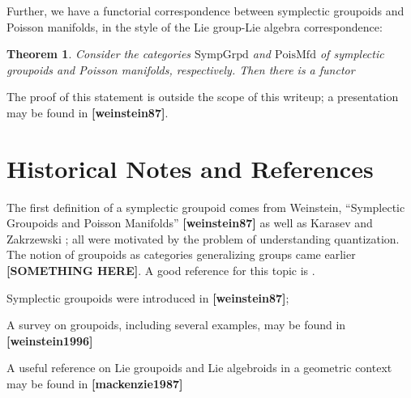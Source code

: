 \documentclass{tufte-handout}
\newtheorem{thrm}{Theorem}
\begin{document}
Further, we have a functorial correspondence between symplectic groupoids and Poisson manifolds, in the style of the Lie group-Lie algebra correspondence:
\begin{thrm}
Consider the categories $\mathrm{SympGrpd}$ and $\mathrm{PoisMfd}$ of symplectic groupoids and Poisson manifolds, respectively. Then there is a functor


\end{thrm}
The proof of this statement is outside the scope of this writeup; a presentation may be found in \textbf{[weinstein87]}.

\section{Historical Notes and References}
The first definition of a symplectic groupoid comes from Weinstein, ``Symplectic Groupoids and Poisson Manifolds'' \textbf{[weinstein87]} as well as Karasev \textbf{} and Zakrzewski \textbf{}; all were motivated by the problem of understanding quantization. The notion of groupoids as categories generalizing groups came earlier \textbf{[SOMETHING HERE]}. A good reference for this topic is \textbf{}. %

Symplectic groupoids were introduced in \textbf{[weinstein87]}; %

A survey on groupoids, including several examples, may be found in \textbf{[weinstein1996]} %

A useful reference on Lie groupoids and Lie algebroids in a geometric context may be found in \textbf{[mackenzie1987]}


\end{document}
